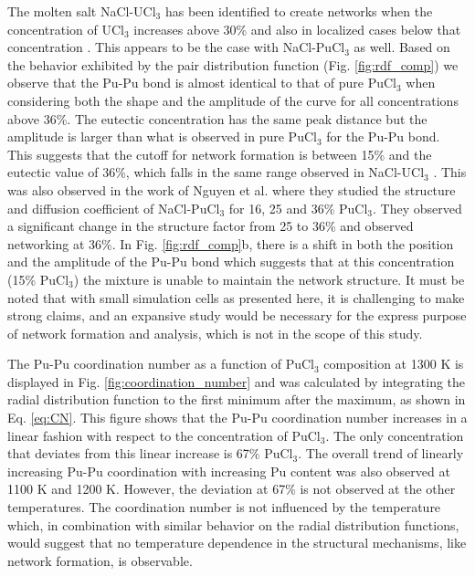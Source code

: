 \documentclass[review]{elsarticle}
\begin{document}
The molten salt NaCl-UCl$_3$ has been identified to create networks when the concentration of UCl$_3$ increases above 30\% and also in localized cases below that concentration \cite{li2019first}. This appears to be the case with NaCl-PuCl$_3$ as well. Based on the behavior exhibited by the pair distribution function (Fig. \ref{fig:rdf_comp}) we observe that the Pu-Pu bond is almost identical to that of pure PuCl$_3$ when considering both the shape and the amplitude of the curve for all concentrations above 36\%. The eutectic concentration has the same peak distance but the amplitude is larger than what is observed in pure PuCl$_3$ for the Pu-Pu bond. This suggests that the cutoff for network formation is between 15\% and the eutectic value of 36\%, which falls in the same range observed in NaCl-UCl$_3$ \cite{ANDERSSON2022153836}. This was also observed in the work of Nguyen et al. \cite{NGUYEN2023101951} where they studied the structure and diffusion coefficient of NaCl-PuCl$_3$ for 16, 25 and 36\% PuCl$_3$. They observed a significant change in the structure factor from 25 to 36\% and observed networking at 36\%. In Fig. \ref{fig:rdf_comp}b, there is a shift in both the position and the amplitude of the Pu-Pu bond which suggests that at this concentration (15\% PuCl$_3$) the mixture is unable to maintain the network structure. It must be noted that with small simulation cells as presented here, it is challenging to make strong claims, and an expansive study would be necessary for the express purpose of network formation and analysis, which is not in the scope of this study. 

The Pu-Pu coordination number as a function of PuCl$_3$ composition at 1300 K is displayed in Fig. \ref{fig:coordination_number} and was calculated by integrating the radial distribution function to the first minimum after the maximum, as shown in Eq. \ref{eq:CN}. This figure shows that the Pu-Pu coordination number increases in a linear fashion with respect to the concentration of PuCl$_3$. The only concentration that deviates from this linear increase is 67\% PuCl$_3$. The overall trend of linearly increasing Pu-Pu coordination with increasing Pu content was also observed at 1100 K and 1200 K. However, the deviation at 67\% is not observed at the other temperatures. The coordination number is not influenced by the temperature which, in combination with similar behavior on the radial distribution functions, would suggest that no temperature dependence in the structural mechanisms, like network formation, is observable.
\end{document}
